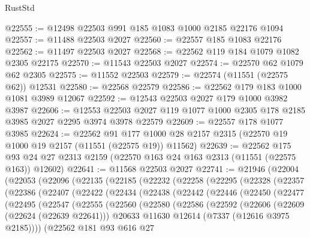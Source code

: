 \begin{lexlean}{RustStd}
\begin{coremodule}
@22555 := @12498 @22503 @991 @185 @1083 @1000 @2185 @22176 @1094
@22557 := @11488 @22503 @2027
@22560 := @22557 @185 @1083 @22176
@22562 := @11497 @22503 @2027
@22568 := @22562 @119 @184 @1079 @1082 @2305 @22175
@22570 := @11543 @22503 @2027
@22574 := @22570 @62 @1079 @62 @2305
@22575 := @11552 @22503
@22579 := @22574 (@11551 (@22575 @62)) @12531
@22580 := @22568 @22579
@22586 := @22562 @179 @183 @1000 @1081 @3989 @12067
@22592 := @12543 @22503 @2027 @179 @1000 @3982 @3987
@22606 := @12553 @22503 @2027 @119 @1077 @1000 @2305 @178 @2185 @3985 @2027 @2295 @3974 @3978 @22579
@22609 := @22557 @178 @1077 @3985
@22624 := @22562
    @91
    @177
    @1000
    @28
    @2157
    @2315
    (@22570 @19 @1000 @19 @2157 (@11551 (@22575 @19)) @11562)
@22639 := @22562
    @175
    @93
    @24
    @27
    @2313
    @2159
    (@22570 @163 @24 @163 @2313 (@11551 (@22575 @163)) @12602)
@22641 := @11568 @22503 @2027
@22741 := @21946
    (@22004
      (@22053
        (@22096
          (@22135
            (@22185
              (@22232
                (@22258
                  (@22295
                    (@22328
                      (@22357
                        (@22386
                          (@22407
                            (@22422
                              (@22434
                                (@22438
                                  (@22442
                                    (@22446
                                      (@22450
                                        (@22477
                                          (@22495
                                            (@22547
                                              (@22555
                                                (@22560
                                                  (@22580
                                                    (@22586
                                                      (@22592
                                                        (@22606
                                                          (@22609 (@22624 (@22639 @22641)))
                                                          @20633
                                                          @11630
                                                          @12614
                                                          (@7337 (@12616 @3975 @2185))))
                                                      (@22562
                                                        @181
                                                        @93
                                                        @616
                                                        @27

\end{coremodule}
\end{lexlean}
